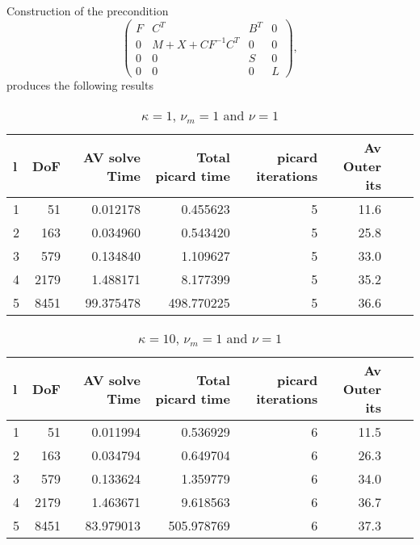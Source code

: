 \documentclass{article}
\begin{document}
Construction of the precondition
\begin{equation}
    \begin{pmatrix}
        F & C^T & B^T & 0 \\
        0 & M+X+CF^{-1}C^T& 0 & 0 \\
        0 & 0 & S & 0 \\
        0 & 0 & 0 & L
    \end{pmatrix},
\end{equation}
produces the following results
\begin{table}[h!]
\begin{tabular}{lrrrrrll}
\hline
 l &   DoF &  AV solve Time &  Total picard time &  picard iterations & Av Outer its \\
\hline
 1 &    51 &       0.012178 &           0.455623 &                  5 &         11.6 \\
 2 &   163 &       0.034960 &           0.543420 &                  5 &         25.8 \\
 3 &   579 &       0.134840 &           1.109627 &                  5 &         33.0 \\
 4 &  2179 &       1.488171 &           8.177399 &                  5 &         35.2 \\
 5 &  8451 &      99.375478 &         498.770225 &                  5 &         36.6 \\
\hline
\end{tabular}
\caption{$\kappa = 1$, $\nu_m = 1$ and $\nu=1$}
\end{table}

\begin{table}[h!]
\begin{tabular}{lrrrrrll}
\hline
 l &   DoF &  AV solve Time &  Total picard time &  picard iterations & Av Outer its \\
\hline
1 &    51 &       0.011994 &           0.536929 &                  6 &         11.5\\
2 &   163 &       0.034794 &           0.649704 &                  6 &         26.3\\
3 &   579 &       0.133624 &           1.359779 &                  6 &         34.0\\
4 &  2179 &       1.463671 &           9.618563 &                  6 &         36.7\\
5 &  8451 &      83.979013 &         505.978769 &                  6 &         37.3\\
\hline
\end{tabular}
\caption{$\kappa = 10$, $\nu_m = 1$ and $\nu=1$}
\end{table}
\end{document}
